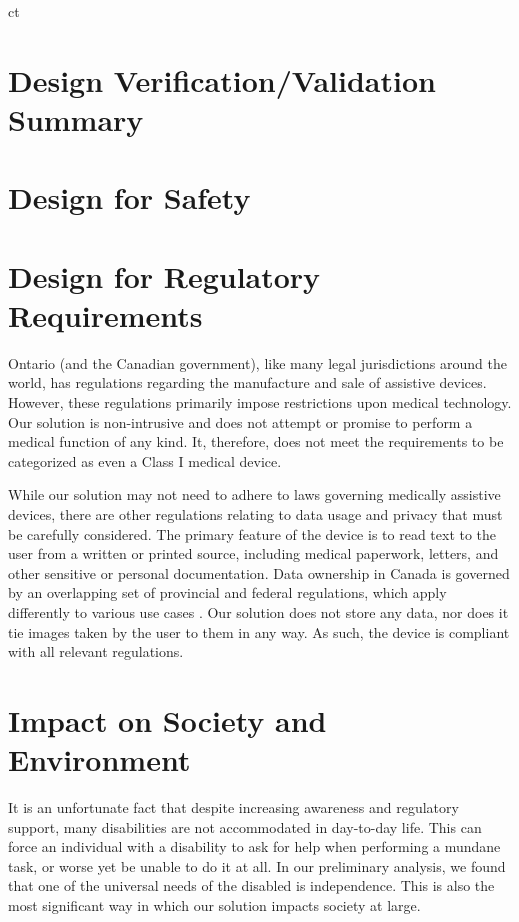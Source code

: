 ct\documentclass[a4paper,11pt]{article}
\begin{document}
\newpage
\section{Design Verification/Validation Summary}


\section{Design for Safety}

\section{Design for Regulatory Requirements}
Ontario (and the Canadian government), like many legal jurisdictions around the world, has regulations regarding the manufacture and sale of assistive devices. However, these regulations primarily impose restrictions upon medical technology. Our solution is non-intrusive and does not attempt or promise to perform a medical function of any kind. It, therefore, does not meet the requirements to be categorized as even a Class I medical device.

While our solution may not need to adhere to laws governing medically assistive devices, there are other regulations relating to data usage and privacy that must be carefully considered. The primary feature of the device is to read text to the user from a written or printed source, including medical paperwork, letters, and other sensitive or personal documentation. Data ownership in Canada is governed by an overlapping set of provincial and federal regulations, which apply differently to various use cases \cite{pipeda}. Our solution does not store any data, nor does it tie images taken by the user to them in any way. As such, the device is compliant with all relevant regulations.

\section{Impact on Society and Environment}
It is an unfortunate fact that despite increasing awareness and regulatory support, many disabilities are not accommodated in day-to-day life. This can force an individual with a disability to ask for help when performing a mundane task, or worse yet be unable to do it at all. In our preliminary analysis, we found that one of the universal needs of the disabled is independence. This is also the most significant way in which our solution impacts society at large.
\end{document}
